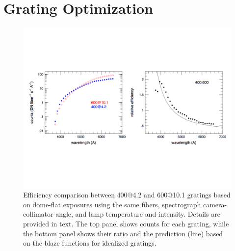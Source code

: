 \chapter{Grating Optimization}
\label{chap:grating}

\begin{figure}[htb]
\centering
\vskip -1.25in
  \includegraphics[width=\textwidth]{Appendix/figs/blaze_comp_land.pdf}
\vskip -1.25in
\caption[NGC 891 observing program grating
optimization]{\label{fig:grating_comp}\fixspacing Efficiency
  comparison between 400@4.2 and 600@10.1 gratings based on dome-flat
  exposures using the same fibers, spectrograph camera-collimator
  angle, and lamp temperature and intensity. Details are provided in
  text. The top panel shows counts for each grating, while the bottom
  panel shows their ratio and the prediction (line) based on the blaze
  functions for idealized gratings.}
\end{figure}




